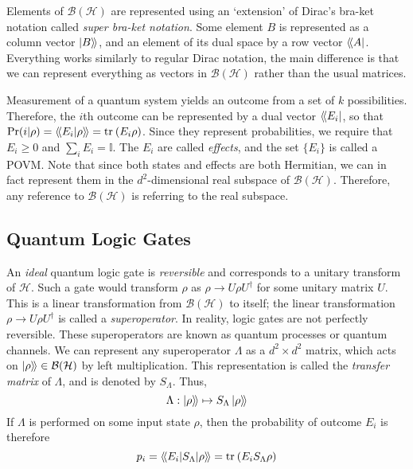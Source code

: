 Elements of $\mathcal{B(H)}$ are represented using an `extension' of Dirac's bra-ket notation called
\textit{super bra-ket notation}. Some element $B$ is represented as a column vector $\ket{B}\!\rangle$,
and an element of its dual space by a row vector $\langle\!\bra{A}$. Everything works similarly to
regular Dirac notation, the main difference is that we can represent everything as vectors in
$\mathcal{B(H)}$ rather than the usual matrices.

Measurement of a quantum system yields an outcome from a set of $k$ possibilities. Therefore, the
$i$th outcome can be represented by a dual vector $\langle\!\bra{E_i}$, so that $\Pr(i | \rho) =
\langle\!\braket{E_i | \rho}\!\rangle = \text{tr}_{}\left(E_i \rho\right)$. Since they represent probabilities, we require that $E_i
\ge 0$ and $\sum_i E_i = \mathbb{I}$. The $E_i$ are called \textit{effects}, and the set $\{E_i \}$
is called a \ac{POVM}.  Note that since both states and effects are both Hermitian, we can in fact
represent them in the $d^2$-dimensional real subspace of $\mathcal{B(H)}$. Therefore, any reference
to $\mathcal{B(H)}$ is referring to the real subspace.

\subsection{Quantum Logic Gates}

An \textit{ideal} quantum logic gate is \textit{reversible} and corresponds to a unitary transform
of $\mathcal{H}$. Such a gate would transform $\rho$ as $\rho \to U \rho U^{\dagger}$ for some
unitary matrix $U$. This is a linear transformation from $\mathcal{B(H)}$ to itself; the linear
transformation $\rho \to U \rho U^{\dagger}$ is called a \textit{superoperator}. In reality, logic
gates are not perfectly reversible. These superoperators are known as quantum processes or quantum
channels. We can represent any superoperator $\Lambda$ as a $d^2 \times d^2$ matrix, which acts on
$\ket{\rho}\!\rangle \in \mathcal{B(H)}$ by left multiplication. This representation is called the
\textit{transfer matrix} of $\Lambda$, and is denoted by $S_{\Lambda}$. Thus,
\begin{equation}
    \Lambda : \ket{\rho}\!\rangle \mapsto S_{\Lambda} \ket{\rho}\!\rangle
\end{equation}
If $\Lambda$ is performed on some input state $\rho$, then the probability of outcome $E_i$ is
therefore
\begin{equation}
    p_i = \langle\!\braket{E_i | S_{\Lambda} | \rho}\!\rangle = \text{tr}_{}\left(E_i S_{\Lambda} \rho\right)
\end{equation}

